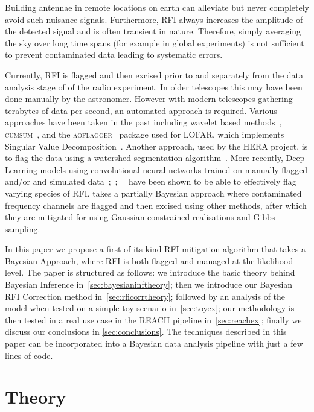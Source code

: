 \documentclass[fleqn,usenatbib]{mnras}
\begin{document}
Building antennae in remote locations on earth can alleviate but never completely avoid such nuisance signals. Furthermore, RFI always increases the amplitude of the detected signal and is often transient in nature. Therefore, simply averaging the sky over long time spans (for example in global experiments) is not sufficient to prevent contaminated data leading to systematic errors.

Currently, RFI is flagged and then excised prior to and separately from the data analysis stage of of the radio experiment. In older telescopes this may have been done manually by the astronomer. However with modern telescopes gathering terabytes of data per second, an automated approach is required. Various approaches have been taken in the past including wavelet based methods~\cite{oslick1998general}, \textsc{cumsum}~\cite{baan2004radio}, and the \textsc{aoflagger}~\cite{offringa2010aoflagger} package used for LOFAR, which implements Singular Value Decomposition~\cite{offringa2010post}. Another approach, used by the HERA project, is to flag the data using a watershed segmentation algorithm~\cite{kerrigan2019optimizing}. More recently, Deep Learning models using convolutional neural networks trained on manually flagged and/or and simulated data~\cite{akeret2017radio};~\cite{vafaei2020deep};~~\cite{sun2022robust} have been shown to be able to effectively flag varying species of RFI. \cite{kennedy2022statistical} takes a partially Bayesian approach where contaminated frequency channels are flagged and then excised using other methods, after which they are mitigated for using  Gaussian constrained realisations and Gibbs sampling.

In this paper we propose a first-of-its-kind RFI mitigation algorithm that takes a Bayesian Approach, where RFI is both flagged and managed at the likelihood level. The paper is structured as follows: we introduce the basic theory behind Bayesian Inference in~\cref{sec:bayesianinftheory}; then we introduce our Bayesian RFI Correction method in~\cref{sec:rficorrtheory}; followed by an analysis of the model when tested on a simple toy scenario in~\cref{sec:toyex}; our methodology is then tested in a real use case in the REACH pipeline in~\cref{sec:reachex}; finally we discuss our conclusions in \cref{sec:conclusions}. The techniques described in this paper can be incorporated into a Bayesian data analysis pipeline with just a few lines of code.


\section{Theory}
\end{document}

